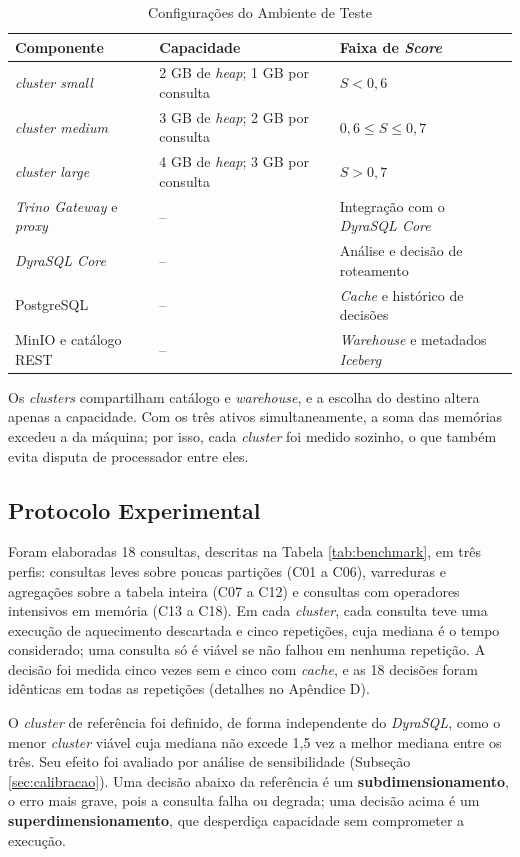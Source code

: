 \begin{table}[H]
	\centering
	\caption{Configurações do Ambiente de Teste}
	\label{tab:ambiente-teste}
	\begin{tabular}{lll}
	\hline
	\textbf{Componente} & \textbf{Capacidade} & \textbf{Faixa de \textit{Score}} \\
	\hline
	\textit{cluster small} & 2 GB de \textit{heap}; 1 GB por consulta & $S < 0,6$ \\
	\textit{cluster medium} & 3 GB de \textit{heap}; 2 GB por consulta & $0,6 \leq S \leq 0,7$ \\
	\textit{cluster large} & 4 GB de \textit{heap}; 3 GB por consulta & $S > 0,7$ \\
	\textit{Trino Gateway} e \textit{proxy} & -- & Integração com o \textit{DyraSQL Core} \\
	\textit{DyraSQL Core} & -- & Análise e decisão de roteamento \\
	PostgreSQL & -- & \textit{Cache} e histórico de decisões \\
	MinIO e catálogo REST & -- & \textit{Warehouse} e metadados \textit{Iceberg} \\
	\hline
	\end{tabular}
\end{table}

Os \textit{clusters} compartilham catálogo e \textit{warehouse}, e a escolha do destino altera apenas a capacidade. Com os três ativos simultaneamente, a soma das memórias excedeu a da máquina; por isso, cada \textit{cluster} foi medido sozinho, o que também evita disputa de processador entre eles.

\subsection{Protocolo Experimental}

Foram elaboradas 18 consultas, descritas na Tabela \ref{tab:benchmark}, em três perfis: consultas leves sobre poucas partições (C01 a C06), varreduras e agregações sobre a tabela inteira (C07 a C12) e consultas com operadores intensivos em memória (C13 a C18). Em cada \textit{cluster}, cada consulta teve uma execução de aquecimento descartada e cinco repetições, cuja mediana é o tempo considerado; uma consulta só é viável se não falhou em nenhuma repetição. A decisão foi medida cinco vezes sem e cinco com \textit{cache}, e as 18 decisões foram idênticas em todas as repetições (detalhes no Apêndice D).

O \textit{cluster} de referência foi definido, de forma independente do \textit{DyraSQL}, como o menor \textit{cluster} viável cuja mediana não excede 1,5 vez a melhor mediana entre os três. Seu efeito foi avaliado por análise de sensibilidade (Subseção \ref{sec:calibracao}). Uma decisão abaixo da referência é um \textbf{subdimensionamento}, o erro mais grave, pois a consulta falha ou degrada; uma decisão acima é um \textbf{superdimensionamento}, que desperdiça capacidade sem comprometer a execução.


